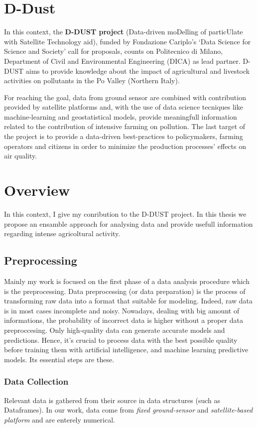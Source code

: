 \section{D-Dust}
In this context, the \textbf{D-DUST project} (Data-driven moDelling of particUlate with Satellite Technology aid), funded by Fondazione Cariplo’s ‘Data Science for Science and Society’ call for proposals, counts on Politecnico di Milano, Department of Civil and Environmental Engineering (DICA) as lead partner.\newline
D-DUST aims to provide knowledge about the impact of agricultural and livestock activities on pollutants in the Po Valley (Northern Italy).\par 
For reaching the goal, data from ground sensor are combined with contribution provided by satellite platforms and, with the use of data science tecniques like machine-learning and geostatistical models, provide meaningfull information related to the contribution of intensive farming on pollution.
The last target of the project is to provide a data-driven best-practices to policymakers, farming operators and citizens in order to minimize the production processes' effects on air quality.
\section{Overview}
In this context, I give my conribution to the D-DUST project. In this thesis we propose an ensamble approach for analysing data and provide usefull information regarding intense agricoltural activity. \par
\subsection{Preprocessing}
Mainly my work is focused on the first phase of a data analysis procedure which is the preprocessing.
Data preprocessing (or data preparation) is the process of transforming raw data into a format that suitable for modeling. Indeed, raw data is in most cases incomplete and noisy.
Nowadays, dealing with big amount of informations, the probability of incorrect data is higher without a proper data preproccesing. 
Only high-quality data can generate accurate models and predictions. Hence, it’s crucial to process data with the best possible quality before training them with artificial intelligence, and machine learning predictive models.
Its essential steps are these.

\subsubsection{Data Collection}
Relevant data is gathered from their source in data structures (such as Dataframes). In our work, data come from \textit{fixed ground-sensor} and \textit{satellite-based platform} and are enterely numerical.
